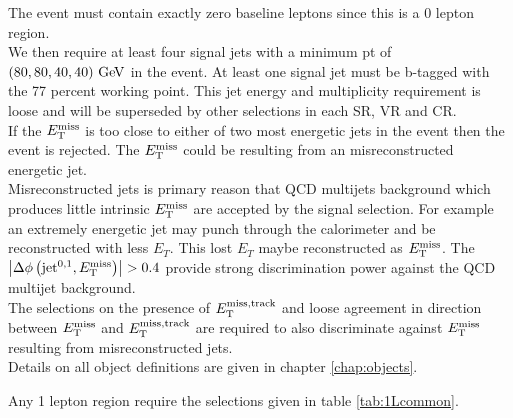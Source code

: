 \indent The event must contain exactly zero baseline leptons since this is a 0 lepton region. \\

\indent We then require at least four signal jets with a minimum pt of $(80,80,40,40) \gev$ in the event.  At least one signal jet must be b-tagged with the 77 percent working point.  This jet energy and multiplicity requirement is loose and will be superseded by other selections in each SR, VR and CR.  \\

\indent If the $E_{\mathrm{T}}^{\mathrm{miss}}$ is too close to either of two most energetic jets in the event then the event is rejected. The $E_{\mathrm{T}}^{\mathrm{miss}}$ could be resulting from an misreconstructed energetic jet.  \\

\indent Misreconstructed jets is primary reason that QCD multijets background which produces little intrinsic $E_{\mathrm{T}}^{\mathrm{miss}}$ are accepted by the signal selection.  For example an extremely energetic jet may punch through the calorimeter and be reconstructed with less $E_T$.  This lost $E_T$ maybe reconstructed as $E_{\mathrm{T}}^{\mathrm{miss}}$.  The $\left|\Delta\phi\left(\mathrm{jet}^{0,1},E_{\mathrm{T}}^{\mathrm{miss}}\right)\right| > 0.4$ provide strong discrimination power against the QCD multijet background. \\

\indent The selections on the presence of $E_{\mathrm{T}}^{\mathrm{miss, track}}$ and loose agreement in direction between $E_{\mathrm{T}}^{\mathrm{miss}}$ and $E_{\mathrm{T}}^{\mathrm{miss, track}}$ are required to also discriminate against $E_{\mathrm{T}}^{\mathrm{miss}}$ resulting from misreconstructed jets. \\

\indent Details on all object definitions are given in chapter \ref{chap:objects}.

\indent Any 1 lepton region require the selections given in table \ref{tab:1Lcommon}. 

